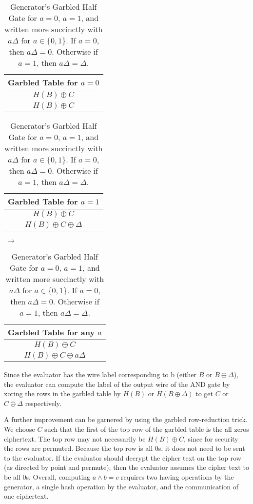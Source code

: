 \begin{table}[h]
    \label{tbl:halfgate-gg-garb}
    \centering
    \begin{tabular}{|c|}
    \hline
    Garbled Table for $a = 0$ \\
    \hline
    $H(B) \oplus C$ \\
    $H(B) \oplus C$ \\
    \hline
    \end{tabular}
    \begin{tabular}{|c|}
    \hline
    Garbled Table for $a = 1$ \\
    \hline
    $H(B) \oplus C$ \\
    $H(B) \oplus C \oplus \Delta$ \\
    \hline
    \end{tabular} $\;\rightarrow$
     \begin{tabular}{|c|}
    \hline
    Garbled Table for any $a$ \\
    \hline
    $H(B) \oplus C$ \\
    $H(B) \oplus C \oplus a\Delta$ \\
    \hline
    \end{tabular}
    \caption{Generator's Garbled Half Gate for $a = 0$, $a = 1$, and written more succinctly with $a\Delta$ for $a \in \{0,1\}$. If $a = 0$, then $a\Delta = 0$.  Otherwise if $a = 1$, then $a\Delta = \Delta$.}
\end{table}

Since the evaluator has the wire label corresponding to b (either $B$ or $B \oplus \Delta$), the evaluator can compute the label of the output wire of the AND gate by xoring the rows in the garbled table by $H(B)$ or $H(B \oplus \Delta)$ to get $C$ or $C \oplus \Delta$ respectively. 

A further improvement can be garnered by using the garbled row-reduction trick.
We choose $C$ such that the first of the top row of the garbled table is the all zeros ciphertext. 
The top row may not necessarily be $H(B) \oplus C$, since for security the rows are permuted. 
Because the top row is all 0s, it does not need to be sent to the evaluator. 
If the evaluator should decrypt the cipher text on the top row (as directed by point and permute), then the evaluator assumes the cipher text to be all 0s. Overall, computing $a \wedge b = c$ requires two having operations by the generator, a single hash operation by the evaluator, and the communication of one ciphertext. 

